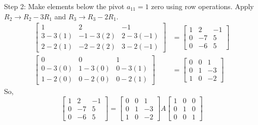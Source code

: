 \documentclass{article}
\begin{document}
Step 2: Make elements below the pivot $a_{11}=1$ zero using row operations.
Apply $R_2 \to R_2 - 3R_1$ and $R_3 \to R_3 - 2R_1$.
\begin{align*} \begin{bmatrix} 1 & 2 & -1 \\ 3 - 3(1) & -1 - 3(2) & 2 - 3(-1) \\ 2 - 2(1) & -2 - 2(2) & 3 - 2(-1) \end{bmatrix} &= \begin{bmatrix} 1 & 2 & -1 \\ 0 & -7 & 5 \\ 0 & -6 & 5 \end{bmatrix} \\ \begin{bmatrix} 0 & 0 & 1 \\ 0 - 3(0) & 1 - 3(0) & 0 - 3(1) \\ 1 - 2(0) & 0 - 2(0) & 0 - 2(1) \end{bmatrix} &= \begin{bmatrix} 0 & 0 & 1 \\ 0 & 1 & -3 \\ 1 & 0 & -2 \end{bmatrix}\end{align*}
So,
\[ \begin{bmatrix} 1 & 2 & -1 \\ 0 & -7 & 5 \\ 0 & -6 & 5 \end{bmatrix} = \begin{bmatrix} 0 & 0 & 1 \\ 0 & 1 & -3 \\ 1 & 0 & -2 \end{bmatrix} A \begin{bmatrix} 1 & 0 & 0 \\ 0 & 1 & 0 \\ 0 & 0 & 1 \end{bmatrix} \]
\end{document}
